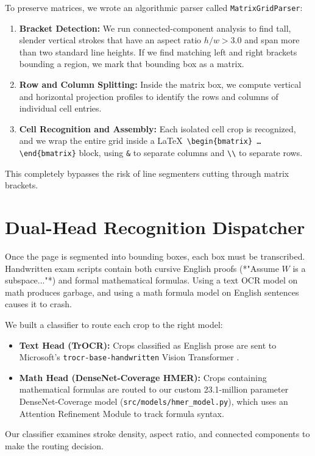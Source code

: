 To preserve matrices, we wrote an algorithmic parser called \texttt{MatrixGridParser}:
\begin{enumerate}
    \item \textbf{Bracket Detection:} We run connected-component analysis to find tall, slender vertical strokes that have an aspect ratio $h/w > 3.0$ and span more than two standard line heights. If we find matching left and right brackets bounding a region, we mark that bounding box as a matrix.
    \item \textbf{Row and Column Splitting:} Inside the matrix box, we compute vertical and horizontal projection profiles to identify the rows and columns of individual cell entries.
    \item \textbf{Cell Recognition and Assembly:} Each isolated cell crop is recognized, and we wrap the entire grid inside a \LaTeX\ \texttt{\textbackslash begin\{bmatrix\} \dots \textbackslash end\{bmatrix\}} block, using \texttt{\&} to separate columns and \texttt{\textbackslash\textbackslash} to separate rows.
\end{enumerate}
This completely bypasses the risk of line segmenters cutting through matrix brackets.

\section{Dual-Head Recognition Dispatcher}
\label{sec:dual_head_dispatcher}

Once the page is segmented into bounding boxes, each box must be transcribed. Handwritten exam scripts contain both cursive English proofs (*"Assume $W$ is a subspace..."*) and formal mathematical formulas. Using a text OCR model on math produces garbage, and using a math formula model on English sentences causes it to crash.

We built a classifier to route each crop to the right model:
\begin{itemize}
    \item \textbf{Text Head (TrOCR):} Crops classified as English prose are sent to Microsoft's \texttt{trocr-base-handwritten} Vision Transformer \cite{li2023trocr}.
    \item \textbf{Math Head (DenseNet-Coverage HMER):} Crops containing mathematical formulas are routed to our custom 23.1-million parameter DenseNet-Coverage model (\texttt{src/models/hmer\_model.py}), which uses an Attention Refinement Module to track formula syntax.
\end{itemize}
Our classifier examines stroke density, aspect ratio, and connected components to make the routing decision.

